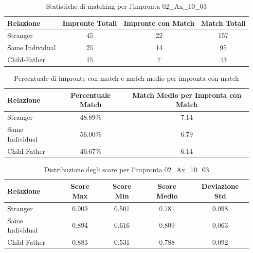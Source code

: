 \begin{table}[htbp]
\centering
\caption{Statistiche di matching per l'impronta 02\_Ax\_10\_03}
\label{tab:results_02_Ax_10_03}
\begin{tabular}{|l|c|c|c|}
\hline
\textbf{Relazione} & \textbf{Impronte Totali} & \textbf{Impronte con Match} & \textbf{Match Totali} \\
\hline
Stranger & 45 & 22 & 157 \\
\hline
Same Individual & 25 & 14 & 95 \\
\hline
Child-Father & 15 & 7 & 43 \\
\hline
\end{tabular}
\end{table}


\begin{table}[htbp]
\centering
\caption{Percentuale di impronte con match e match medio per impronta con match}
\label{tab:match_percentage_02_Ax_10_03}
\begin{tabular}{|l|c|c|}
\hline
\textbf{Relazione} & \textbf{Percentuale Match} & \textbf{Match Medio per Impronta con Match} \\
\hline
Stranger & 48.89\% & 7.14 \\
\hline
Same Individual & 56.00\% & 6.79 \\
\hline
Child-Father & 46.67\% & 6.14 \\
\hline
\end{tabular}
\end{table}


\begin{table}[htbp]
\centering
\caption{Distribuzione degli score per l'impronta 02\_Ax\_10\_03}
\label{tab:scores_02_Ax_10_03}
\begin{tabular}{|l|c|c|c|c|}
\hline
\textbf{Relazione} & \textbf{Score Max} & \textbf{Score Min} & \textbf{Score Medio} & \textbf{Deviazione Std} \\
\hline
Stranger & 0.909 & 0.501 & 0.781 & 0.098 \\
\hline
Same Individual & 0.894 & 0.616 & 0.809 & 0.063 \\
\hline
Child-Father & 0.883 & 0.531 & 0.788 & 0.092 \\
\hline
\end{tabular}
\end{table}

